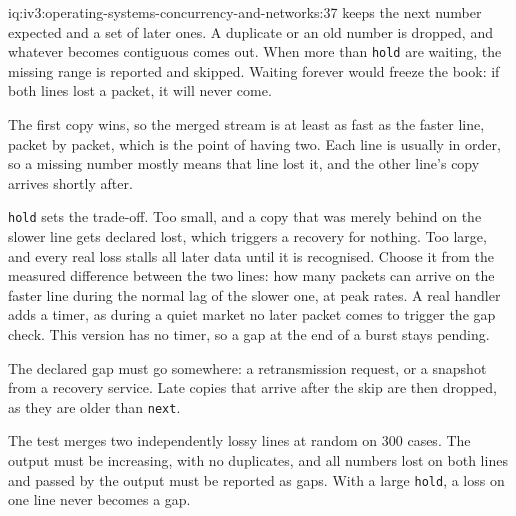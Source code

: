 \begin{solution}{iq:iv3:operating-systems-concurrency-and-networks:37}
 keeps the next number expected and a set of later ones. A duplicate or an old number is dropped, and whatever becomes contiguous comes out. When more than \texttt{hold} are waiting, the missing range is reported and skipped. Waiting forever would freeze the book: if both lines lost a packet, it will never come.
\label{lst:iv3:os:arb}

The first copy wins, so the merged stream is at least as fast as the faster line, packet by packet, which is the point of having two. Each line is usually in order, so a missing number mostly means that line lost it, and the other line's copy arrives shortly after.

\texttt{hold} sets the trade-off. Too small, and a copy that was merely behind on the slower line gets declared lost, which triggers a recovery for nothing. Too large, and every real loss stalls all later data until it is recognised. Choose it from the measured difference between the two lines: how many packets can arrive on the faster line during the normal lag of the slower one, at peak rates. A real handler adds a timer, as during a quiet market no later packet comes to trigger the gap check. This version has no timer, so a gap at the end of a burst stays pending.

The declared gap must go somewhere: a retransmission request, or a snapshot from a recovery service. Late copies that arrive after the skip are then dropped, as they are older than \texttt{next}.

The test merges two independently lossy lines at random on 300 cases. The output must be increasing, with no duplicates, and all numbers lost on both lines and passed by the output must be reported as gaps. With a large \texttt{hold}, a loss on one line never becomes a gap.

\end{solution}

